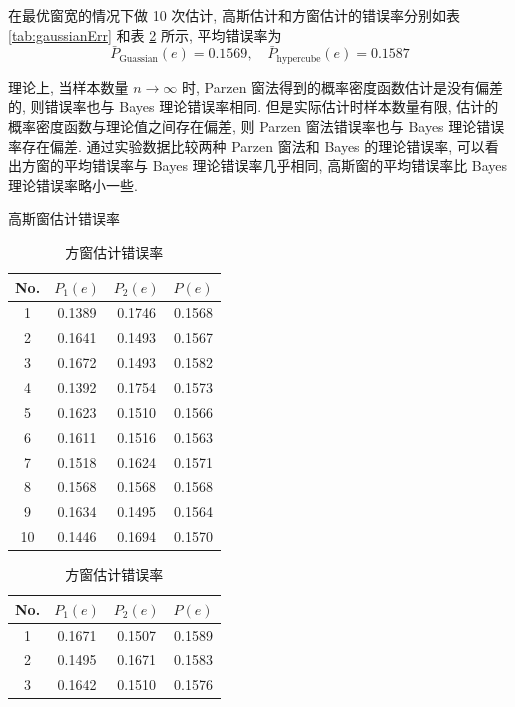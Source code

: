 \documentclass{article}
\begin{document}
在最优窗宽的情况下做 10 次估计, 高斯估计和方窗估计的错误率分别如表 \ref{tab:gaussianErr} 和表 \ref{tab:rectErr} 所示, 平均错误率为
\begin{equation}
  \bar{P}_{\mathrm{Guassian}}(e)=0.1569,\quad \bar{P}_{\mathrm{hypercube}}(e)=0.1587
\end{equation}

理论上, 当样本数量 $n\to\infty$ 时, Parzen 窗法得到的概率密度函数估计是没有偏差的, 则错误率也与 Bayes 理论错误率相同. 但是实际估计时样本数量有限, 估计的概率密度函数与理论值之间存在偏差, 则 Parzen 窗法错误率也与 Bayes 理论错误率存在偏差. 通过实验数据比较两种 Parzen 窗法和 Bayes 的理论错误率, 可以看出方窗的平均错误率与 Bayes 理论错误率几乎相同, 高斯窗的平均错误率比 Bayes 理论错误率略小一些.

\begin{table}[htbp]
  \centering
  \begin{minipage}{0.4\textwidth}
    \centering
    \caption{高斯窗估计错误率}
    \label{tab:gaussianErr}
    \begin{tabular}{c|ccc}
      \hline
      No. & $P_1(e)$ & $P_2(e)$ & $P(e)$ \\
      \hline
      1  & 0.1389 & 0.1746 & 0.1568 \\
      2  & 0.1641 & 0.1493 & 0.1567 \\
      3  & 0.1672 & 0.1493 & 0.1582 \\
      4  & 0.1392 & 0.1754 & 0.1573 \\
      5  & 0.1623 & 0.1510 & 0.1566 \\
      6  & 0.1611 & 0.1516 & 0.1563 \\
      7  & 0.1518 & 0.1624 & 0.1571 \\
      8  & 0.1568 & 0.1568 & 0.1568 \\
      9  & 0.1634 & 0.1495 & 0.1564 \\
      10 & 0.1446 & 0.1694 & 0.1570 \\
      \hline   
    \end{tabular}
  \end{minipage}
  \begin{minipage}{0.4\textwidth}
    \centering
    \caption{方窗估计错误率}
    \label{tab:rectErr}
    \begin{tabular}{c|ccc}
      \hline
      No. & $P_1(e)$ & $P_2(e)$ & $P(e)$ \\
      \hline
      1  & 0.1671 & 0.1507 & 0.1589 \\
      2  & 0.1495 & 0.1671 & 0.1583 \\
      3  & 0.1642 & 0.1510 & 0.1576 \\

\end{tabular}
\end{minipage}
\end{table}
\end{document}
